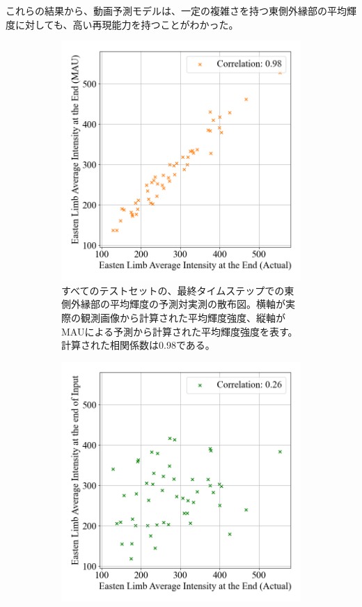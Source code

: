         これらの結果から、動画予測モデルは、一定の複雑さを持つ東側外縁部の平均輝度に対しても、高い再現能力を持つことがわかった。
        \begin{figure}[htbp]
          \begin{subfigure}[b]{0.53\textwidth}
            \centering
            \includegraphics[width=\textwidth]{figures/exp1/limb_scatter_gt_pd.png}
            \caption{すべてのテストセットの、最終タイムステップでの東側外縁部の平均輝度の予測対実測の散布図。横軸が実際の観測画像から計算された平均輝度強度、縦軸がMAUによる予測から計算された平均輝度強度を表す。計算された相関係数は0.98である。}
          \end{subfigure}
          \begin{subfigure}[b]{0.55\textwidth}
            \centering
            \includegraphics[width=\textwidth]{figures/exp1/limb_scatter_gt_sp.png}

\end{subfigure}
\end{figure}
